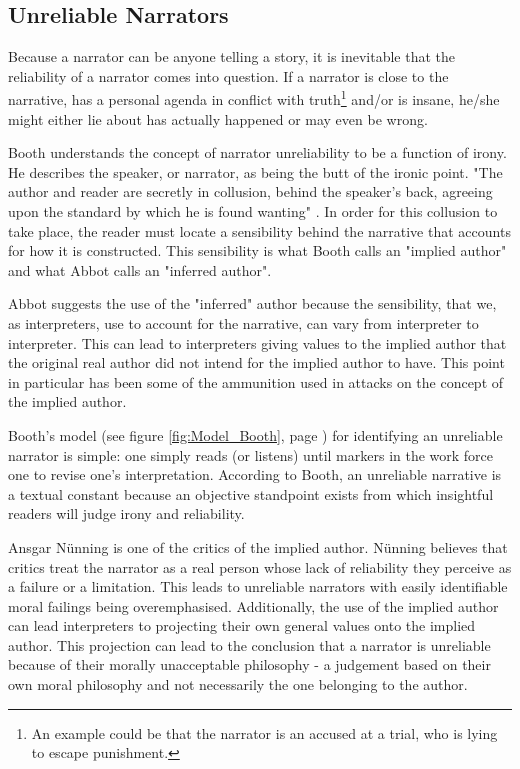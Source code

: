 \subsection{Unreliable Narrators}
Because a narrator can be anyone telling a story, it is inevitable that the reliability of a narrator comes into question. If a narrator is close to the narrative, has a personal agenda in conflict with truth\footnote{An example could be that the narrator is an accused at a trial, who is lying to escape punishment.} and/or is insane, he/she might either lie about has actually happened or may even be wrong. 

Booth understands the concept of narrator unreliability to be a function of irony. He describes the speaker, or narrator, as being the butt of the ironic point. "The author and reader are secretly in collusion, behind the speaker's back, agreeing upon the standard by which he is found wanting" \cite[p. 94]{Olson}. In order for this collusion to take place, the reader must locate a sensibility behind the narrative that accounts for how it is constructed. This sensibility is what Booth calls an "implied author" \cite[p. 94]{Olson} and what Abbot calls an "inferred author"\cite[p. 84-85]{Abbot}.

Abbot suggests the use of the "inferred" author because the sensibility, that we, as interpreters, use to account for the narrative, can vary from interpreter to interpreter. This can lead to interpreters giving values to the implied author that the original real author did not intend for the implied author to have. This point in particular has been some of the ammunition used in attacks on the concept of the implied author.\cite[p.85]{Abbot}


Booth's model (see figure \ref{fig:Model_Booth}, page \pageref{fig:Model_Booth}) for identifying an unreliable narrator is simple: one simply reads (or listens) until markers in the work force one to revise one's interpretation. According to Booth, an unreliable narrative is a textual constant because an objective standpoint exists from which insightful readers will judge irony and reliability.\cite[p. 95]{Olson}

Ansgar N\"unning is one of the critics of the implied author. N\"unning believes that critics treat the narrator as a real person whose lack of reliability they perceive as a failure or a limitation. This leads to unreliable narrators with easily identifiable moral failings being overemphasised. Additionally, the use of the implied author can lead interpreters to projecting their own general values onto the implied author. This projection can lead to the conclusion that a narrator is unreliable because of their morally unacceptable philosophy - a judgement based on their own moral philosophy and not necessarily the one belonging to the author. \cite[p. 96-97]{Olson} 

